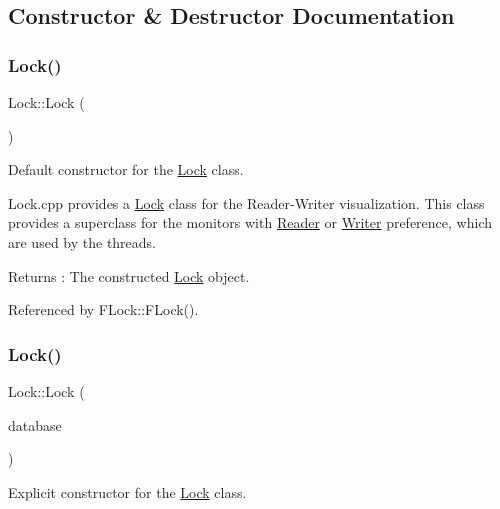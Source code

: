 \subsection{Constructor \& Destructor Documentation}
\mbox{\label{class_lock_a9944623567d8138b95e74fadc7190adb}} 
\subsubsection{\texorpdfstring{Lock()}{Lock()}\hspace{0.1cm}{\footnotesize\ttfamily [1/2]}}
{\footnotesize\ttfamily Lock\+::\+Lock (\begin{DoxyParamCaption}{ }\end{DoxyParamCaption})}



Default constructor for the \hyperlink{class_lock}{Lock} class. 

Lock.\+cpp provides a \hyperlink{class_lock}{Lock} class for the Reader-\/\+Writer visualization. This class provides a superclass for the monitors with \hyperlink{class_reader}{Reader} or \hyperlink{class_writer}{Writer} preference, which are used by the threads. \begin{DoxyReturn}{Returns}
\+: The constructed \hyperlink{class_lock}{Lock} object. 
\end{DoxyReturn}


Referenced by F\+Lock\+::\+F\+Lock().

\mbox{\label{class_lock_a6e5be419fc8b9db7b8c599e805634083}} 
\subsubsection{\texorpdfstring{Lock()}{Lock()}\hspace{0.1cm}{\footnotesize\ttfamily [2/2]}}
{\footnotesize\ttfamily Lock\+::\+Lock (\begin{DoxyParamCaption}\item[{\hyperlink{class_r_w_database}{R\+W\+Database}$<$ \hyperlink{classtsgl_1_1_rectangle}{tsgl\+::\+Rectangle} $\ast$$>$ $\ast$}]{database }\end{DoxyParamCaption})}



Explicit constructor for the \hyperlink{class_lock}{Lock} class. 


